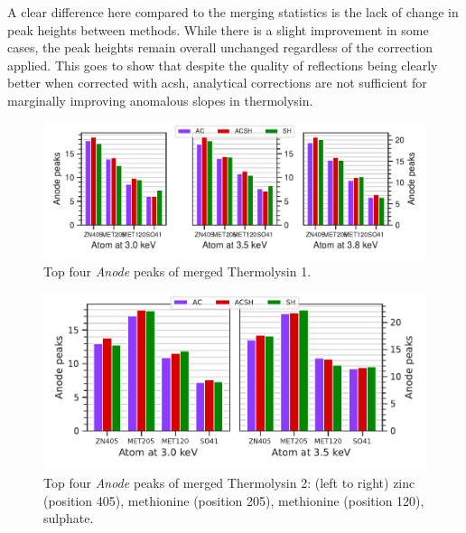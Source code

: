 A clear difference here compared to the merging statistics is the lack of change in peak heights between methods. While there is a slight improvement in some cases, the peak heights remain overall unchanged regardless of the correction applied. This goes to show that despite the quality of reflections being clearly better when corrected with \ac{acsh}, analytical corrections are not sufficient for marginally improving anomalous slopes in thermolysin.%

\begin{figure}[h]
    \centering
    \includegraphics[width = 1.0 \textwidth]{plots/exp1/tlys_9_P6122/peaks/merged_peaks_so4.pdf}
    \caption{Top four \textit{Anode} peaks of merged Thermolysin 1.}
    \label{fig:tlys_9_merged_peaks}
\end{figure}

\begin{figure}[h]
    \centering
    \includegraphics{plots/exp1/tlys_2_P6122/peaks/merged_peaks.pdf}
    \caption{Top four \textit{Anode} peaks of merged Thermolysin 2: (left to right) zinc (position 405), methionine (position 205), methionine (position 120), sulphate.}
    \label{fig:tlys_2_merged_peaks}
\end{figure}


